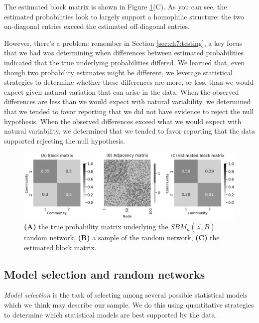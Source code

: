 The estimated block matrix is shown in Figure \ref{fig:ch7:model:ex}(C). As you can see, the estimated probabilities look to largely support a homophilic structure: the two on-diagonal entries exceed the estimated off-diagonal entries. 

However, there's a problem: remember in Section \ref{sec:ch7:testing}, a key focus that we had was determining when differences between estimated probabilities indicated that the true underlying probabilities differed. We learned that, even though two probability estimates might be different, we leverage statistical strategies to determine whether these differences are more, or less, than we would expect given natural variation that can arise in the data. When the observed differences are less than we would expect with natural variability, we determined that we tended to favor reporting that we did not have evidence to reject the null hypothesis. When the observed differences exceed what we would expect with natural variability, we determined that we tended to favor reporting that the data supported rejecting the null hypothesis.

\begin{figure}[h]
    \centering
    \includegraphics[width=\linewidth]{applications/ch7/Images/model_select_ex.png}
    \caption[Selecting optimal models]{\textbf{(A)} the true probability matrix underlying the $SBM_n(\vec z, B)$ random network, \textbf{(B)} a sample of the random network, \textbf{(C)} the estimated block matrix.}
    \label{fig:ch7:model:ex}
\end{figure}

\subsection{Model selection and random networks}

\textit{Model selection} is the task of selecting among several possible statistical models which we think may describe our sample. We do this using quantitative strategies to determine which statistical models are best supported by the data. 

